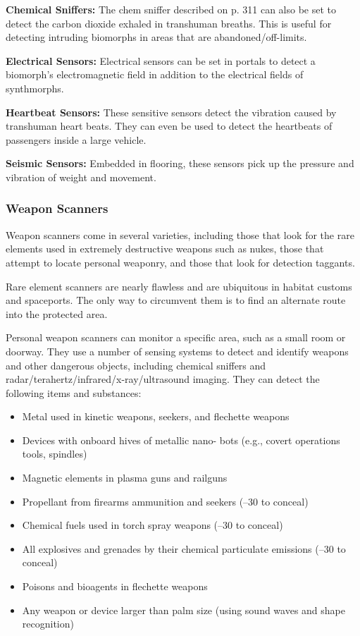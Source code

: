 \textbf{Chemical Sniffers:} The chem sniffer described on 
p. 311 can also be set to detect the carbon dioxide 
exhaled in transhuman breaths. This is useful for 
detecting intruding biomorphs in areas that are 
abandoned/off-limits.

\textbf{Electrical Sensors:} Electrical sensors can be set in 
portals to detect a biomorph's electromagnetic field 
in addition to the electrical fields of synthmorphs.

\textbf{Heartbeat Sensors:} These sensitive sensors detect 
the vibration caused by transhuman heart beats. 
They can even be used to detect the heartbeats of 
passengers inside a large vehicle.

\textbf{Seismic Sensors:} Embedded in flooring, these sensors
pick up the pressure and vibration of weight
and movement.

\subsubsection{Weapon Scanners}

Weapon scanners come in several varieties, including
those that look for the rare elements used in
extremely destructive weapons such as nukes, those 
that attempt to locate personal weaponry, and those 
that look for detection taggants.

Rare element scanners are nearly flawless and are 
ubiquitous in habitat customs and spaceports. The 
only way to circumvent them is to find an alternate 
route into the protected area.

Personal weapon scanners can monitor a specific 
area, such as a small room or doorway. They use 
a number of sensing systems to detect and identify 
weapons and other dangerous objects, including 
chemical sniffers and radar/terahertz/infrared/x-ray/ultrasound imaging. They can detect the following 
items and substances:

\begin{itemize}
\item Metal used in kinetic weapons, seekers, and flechette weapons
\item Devices with onboard hives of metallic nano- bots (e.g., covert operations tools, spindles)
\item Magnetic elements in plasma guns and railguns
\item Propellant from firearms ammunition and seekers (–30 to conceal)
\item Chemical fuels used in torch spray weapons (–30 to conceal)
\item All explosives and grenades by their chemical particulate emissions (–30 to conceal)
\item Poisons and bioagents in flechette weapons
\item Any weapon or device larger than palm size (using sound waves and shape recognition)
\end{itemize}

